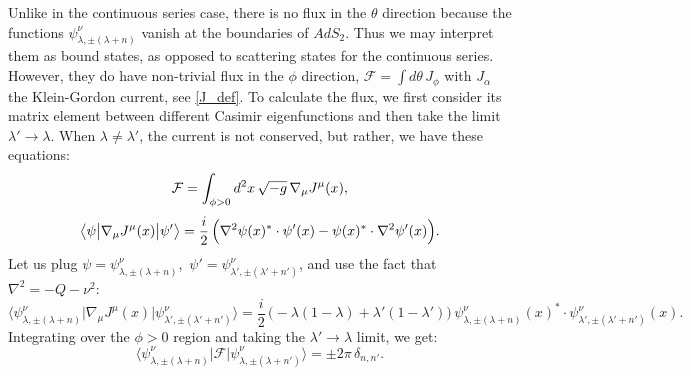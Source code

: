\documentclass[12pt]{article}
\newcommand{\blangle}{\bigl\langle}
\newcommand{\brangle}{\bigr\rangle}
\newcommand*{\bbra}[1]{\blangle{#1}\big|}
\newcommand*{\bket}[1]{\big|{#1}\brangle}
\newcommand{\calF}{\mathcal{F}}
\DeclareMathOperator{\AdS}{AdS}
\newcommand{\tht}{\theta}
\newcommand{\lam}{\lambda}
\def\AdS{AdS}
\begin{document}
Unlike in the continuous series case, there is no flux in the $\theta$ direction because the functions $\psi^{\nu}_{\lam,\pm(\lam+n)}$ vanish at the boundaries of $\AdS_2$. Thus we may interpret them as bound states, as opposed to scattering states for the continuous series. However, they do have non-trivial flux in the $\phi$ direction, $\calF=\int d\tht \, J_{\phi}$ with $J_{\alpha}$ the Klein-Gordon current, see \eqref{J_def}. To calculate the flux, we first consider its matrix element between different Casimir eigenfunctions and then take the limit $\lambda'\to\lambda$. When $\lambda\not=\lambda'$, the current is not conserved, but rather, we have these equations:
\begin{gather}
\calF=\int_{\phi>0} d^{2}x\,\sqrt{-g}\,\nabla_{\mu}J^{\mu}(x),
\\[3pt]
\bbra{\psi}\nabla_{\mu}J^{\mu}(x)\bket{\psi'}
=\frac{i}{2}\,\Bigl(\nabla^{2}\psi(x)^{*}\cdot\psi'(x)
-\psi(x)^{*}\cdot\nabla^{2}\psi'(x)\Bigr).
\end{gather}
Let us plug $\psi=\psi^{\nu}_{\lam,\pm(\lam+n)}$,\, $\psi'=\psi^{\nu}_{\lam',\pm(\lam'+n')}$, and use the fact that $\nabla^2=-Q-\nu^2$:
\begin{equation}
\bbra{\psi^{\nu}_{\lam,\pm(\lam+n)}}\nabla_{\mu}J^{\mu}(x)
\bket{\psi^{\nu}_{\lam',\pm(\lam'+n')}}
=\frac{i}{2}\,\bigl(-\lambda(1-\lambda)+\lambda'(1-\lambda')\bigr)\,
\psi^{\nu}_{\lam,\pm(\lam+n)}(x)^{*}\cdot\psi^{\nu}_{\lam',\pm(\lam'+n')}(x).
\end{equation}
Integrating over the $\phi>0$ region and taking the $\lambda'\to\lambda$ limit, we get:
\begin{equation}
\bbra{\psi^{\nu}_{\lam,\pm(\lam+n)}}\calF
\bket{\psi^{\nu}_{\lam,\pm(\lam+n')}}
=\pm 2\pi\,\delta_{n,n'}.
\end{equation}
\end{document}
